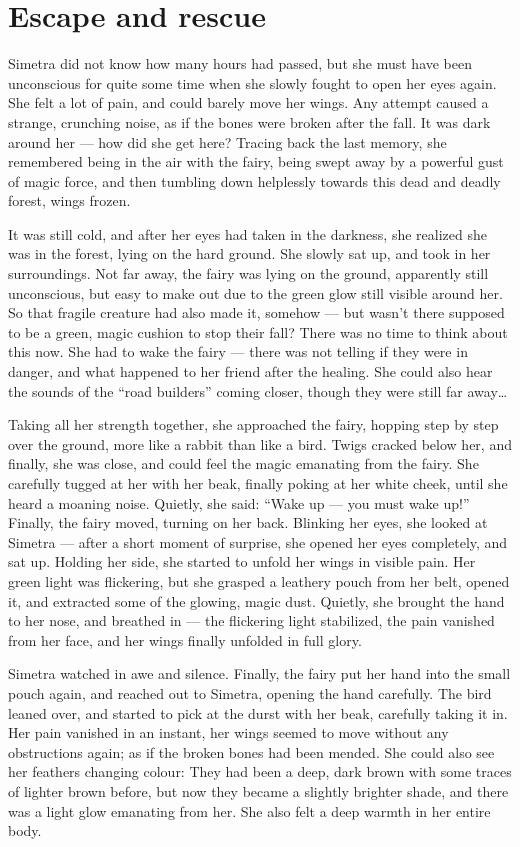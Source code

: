 \chapter{Escape and rescue}
\label{cha:escape-rescue}
Simetra did not know how many hours had passed, but she must have been unconscious for quite some time when she slowly fought to open her eyes again.
She felt a lot of pain, and could barely move her wings. Any attempt caused a strange, crunching noise, as if the bones were broken after the fall. It was dark around her --- how did she get here? Tracing back the last memory, she remembered being in the air with the fairy, being swept away by a powerful gust of magic force, and then tumbling down helplessly towards this dead and deadly forest, wings frozen.

It was still cold, and after her eyes had taken in the darkness, she realized she was in the forest, lying on the hard ground. She slowly sat up, and took in her surroundings. Not far away, the fairy was lying on the ground, apparently still unconscious, but easy to make out due to the green glow still visible around her. So that fragile creature had also made it, somehow --- but wasn't there supposed to be a green, magic cushion to stop their fall?
There was no time to think about this now. She had to wake the fairy --- there was not telling if they were in danger, and what happened to her friend after the healing. She could also hear the sounds of the \enquote{road builders} coming closer, though they were still far away\dots{}

Taking all her strength together, she approached the fairy, hopping step by step over the ground, more like a rabbit than like a bird. Twigs cracked below her, and finally, she was close, and could feel the magic emanating from the fairy. She carefully tugged at her with her beak, finally poking at her white cheek, until she heard a moaning noise. Quietly, she said: \enquote{Wake up --- you must wake up!} Finally, the fairy moved, turning on her back. Blinking her eyes, she looked at Simetra --- after a short moment of surprise, she opened her eyes completely, and sat up. Holding her side, she started to unfold her wings in visible pain. Her green light was flickering, but she grasped a leathery pouch from her belt, opened it, and extracted some of the glowing, magic dust. Quietly, she brought the hand to her nose, and breathed in --- the flickering light stabilized, the pain vanished from her face, and her wings finally unfolded in full glory.

Simetra watched in awe and silence. Finally, the fairy put her hand into the small pouch again, and reached out to Simetra, opening the hand carefully. The bird leaned over, and started to pick at the durst with her beak, carefully taking it in. Her pain vanished in an instant, her wings seemed to move without any obstructions again; as if the broken bones had been mended. She could also see her feathers changing colour: They had been a deep, dark brown with some traces of lighter brown before, but now they became a slightly brighter shade, and there was a light glow emanating from her. She also felt a deep warmth in her entire body.

